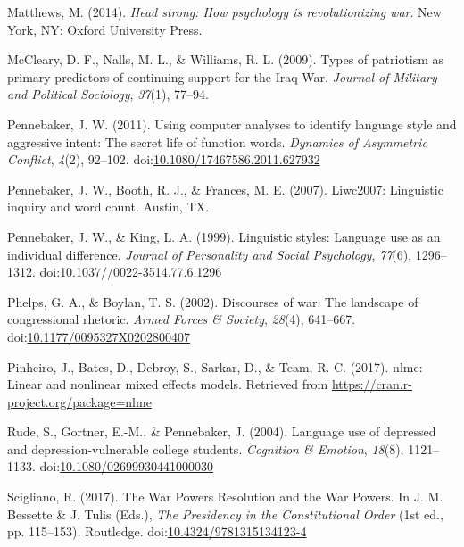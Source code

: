 \documentclass[
  english,
  ,man,floatsintext]{apa6}
\begin{document}
\leavevmode\hypertarget{ref-Matthews2014}{}%
Matthews, M. (2014). \emph{Head strong: How psychology is revolutionizing war}. New York, NY: Oxford University Press.

\leavevmode\hypertarget{ref-McCleary2009}{}%
McCleary, D. F., Nalls, M. L., \& Williams, R. L. (2009). Types of patriotism as primary predictors of continuing support for the Iraq War. \emph{Journal of Military and Political Sociology}, \emph{37}(1), 77--94.

\leavevmode\hypertarget{ref-Pennebaker2011}{}%
Pennebaker, J. W. (2011). Using computer analyses to identify language style and aggressive intent: The secret life of function words. \emph{Dynamics of Asymmetric Conflict}, \emph{4}(2), 92--102. doi:\href{https://doi.org/10.1080/17467586.2011.627932}{10.1080/17467586.2011.627932}

\leavevmode\hypertarget{ref-Pennebaker2007}{}%
Pennebaker, J. W., Booth, R. J., \& Frances, M. E. (2007). Liwc2007: Linguistic inquiry and word count. Austin, TX.

\leavevmode\hypertarget{ref-Pennebaker1999}{}%
Pennebaker, J. W., \& King, L. A. (1999). Linguistic styles: Language use as an individual difference. \emph{Journal of Personality and Social Psychology}, \emph{77}(6), 1296--1312. doi:\href{https://doi.org/10.1037//0022-3514.77.6.1296}{10.1037//0022-3514.77.6.1296}

\leavevmode\hypertarget{ref-Phelps2002}{}%
Phelps, G. A., \& Boylan, T. S. (2002). Discourses of war: The landscape of congressional rhetoric. \emph{Armed Forces \& Society}, \emph{28}(4), 641--667. doi:\href{https://doi.org/10.1177/0095327X0202800407}{10.1177/0095327X0202800407}

\leavevmode\hypertarget{ref-Pinheiro2017}{}%
Pinheiro, J., Bates, D., Debroy, S., Sarkar, D., \& Team, R. C. (2017). nlme: Linear and nonlinear mixed effects models. Retrieved from \url{https://cran.r-project.org/package=nlme}

\leavevmode\hypertarget{ref-Rude2004}{}%
Rude, S., Gortner, E.-M., \& Pennebaker, J. (2004). Language use of depressed and depression-vulnerable college students. \emph{Cognition \& Emotion}, \emph{18}(8), 1121--1133. doi:\href{https://doi.org/10.1080/02699930441000030}{10.1080/02699930441000030}

\leavevmode\hypertarget{ref-Bessette2017}{}%
Scigliano, R. (2017). The War Powers Resolution and the War Powers. In J. M. Bessette \& J. Tulis (Eds.), \emph{The Presidency in the Constitutional Order} (1st ed., pp. 115--153). Routledge. doi:\href{https://doi.org/10.4324/9781315134123-4}{10.4324/9781315134123-4}
\end{document}
